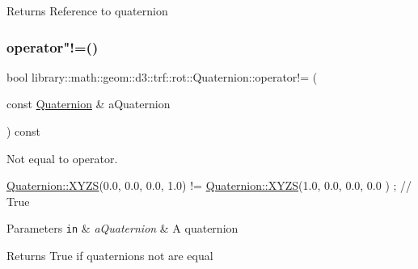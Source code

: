 \begin{DoxyReturn}{Returns}
Reference to quaternion 
\end{DoxyReturn}
\mbox{\label{classlibrary_1_1math_1_1geom_1_1d3_1_1trf_1_1rot_1_1_quaternion_ab4862c47d1ca9beed37023ec2db479f4}} 
\subsubsection{\texorpdfstring{operator"!=()}{operator!=()}}
{\footnotesize\ttfamily bool library\+::math\+::geom\+::d3\+::trf\+::rot\+::\+Quaternion\+::operator!= (\begin{DoxyParamCaption}\item[{const \hyperlink{classlibrary_1_1math_1_1geom_1_1d3_1_1trf_1_1rot_1_1_quaternion}{Quaternion} \&}]{a\+Quaternion }\end{DoxyParamCaption}) const}



Not equal to operator. 


\begin{DoxyCode}
\hyperlink{classlibrary_1_1math_1_1geom_1_1d3_1_1trf_1_1rot_1_1_quaternion_a006294eb483bcfc352c2dc36cf19ceec}{Quaternion::XYZS}(0.0, 0.0, 0.0, 1.0) != \hyperlink{classlibrary_1_1math_1_1geom_1_1d3_1_1trf_1_1rot_1_1_quaternion_a006294eb483bcfc352c2dc36cf19ceec}{Quaternion::XYZS}(1.0, 0.0, 0.0, 0.0
      ) ; \textcolor{comment}{// True}
\end{DoxyCode}



\begin{DoxyParams}[1]{Parameters}
\mbox{\tt in}  & {\em a\+Quaternion} & A quaternion \\
\hline
\end{DoxyParams}
\begin{DoxyReturn}{Returns}
True if quaternions not are equal 
\end{DoxyReturn}
\mbox{\label{classlibrary_1_1math_1_1geom_1_1d3_1_1trf_1_1rot_1_1_quaternion_a7f09ef0c53cb1f2d68a5c0aa8fb9de56}} 
